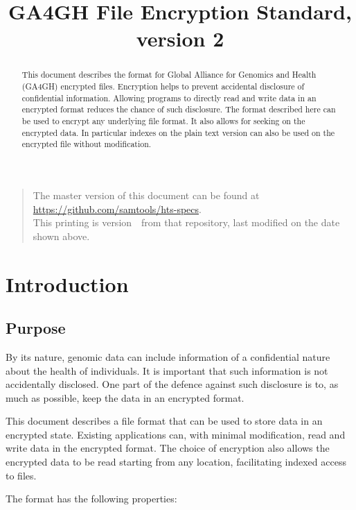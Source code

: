 \documentclass[10pt]{article}
\begin{document}

\title{GA4GH File Encryption Standard, version 2}
\date{\headdate}
\maketitle
\begin{quote}\small
The master version of this document can be found at
\url{https://github.com/samtools/hts-specs}.\\
This printing is version~\commitdesc\ from that repository,
last modified on the date shown above.
\end{quote}
\vspace*{1em}

\begin{abstract}
This document describes the format for Global Alliance for Genomics and Health (GA4GH) encrypted files.
Encryption helps to prevent accidental disclosure of confidential information.
Allowing programs to directly read and write data in an encrypted format reduces the chance of such disclosure.
The format described here can be used to encrypt any underlying file format.
It also allows for seeking on the encrypted data.
In particular indexes on the plain text version can also be used on the encrypted file without modification.
\end{abstract}
\newpage
\tableofcontents
\newpage
\section{Introduction}
\subsection{Purpose}
By its nature, genomic data can include information of a confidential nature about the health of individuals.
It is important that such information is not accidentally disclosed.
One part of the defence against such disclosure is to, as much as possible, keep the data in an encrypted format.

This document describes a file format that can be used to store data in an encrypted state.
Existing applications can, with minimal modification, read and write data in the encrypted format.
The choice of encryption also allows the encrypted data to be read starting from any location, facilitating indexed
access to files.

The format has the following properties:
\end{document}
